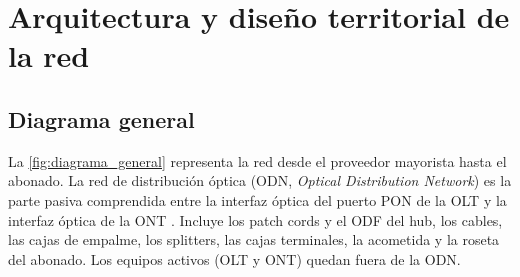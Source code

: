\section{Arquitectura y diseño territorial de la red}
\label{sec:arquitectura}

\subsection{Diagrama general}
\label{sec:diagrama_general}
La \autoref{fig:diagrama_general} representa la red desde el proveedor mayorista hasta el abonado. La red de distribución óptica (ODN, \textit{Optical Distribution Network}) es la parte pasiva comprendida entre la interfaz óptica del puerto PON de la OLT y la interfaz óptica de la ONT \cite{g984_2}. Incluye los patch cords y el ODF del hub, los cables, las cajas de empalme, los splitters, las cajas terminales, la acometida y la roseta del abonado. Los equipos activos (OLT y ONT) quedan fuera de la ODN.

